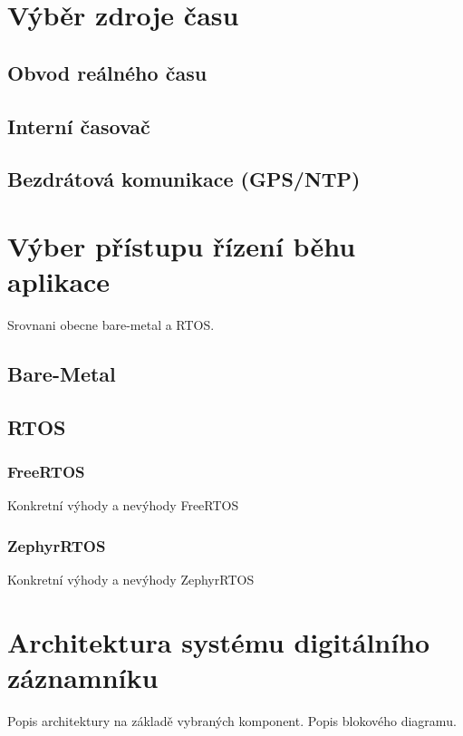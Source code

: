 \section{Výběr zdroje času}

\subsection{Obvod reálného času}

\subsection{Interní časovač}

\subsection{Bezdrátová komunikace (GPS/NTP)}

\section{Výber přístupu řízení běhu aplikace}
Srovnani obecne bare-metal a RTOS.


\subsection{Bare-Metal}

\subsection{RTOS}
\subsubsection{FreeRTOS}
Konkretní výhody a nevýhody FreeRTOS

\subsubsection{ZephyrRTOS}
Konkretní výhody a nevýhody ZephyrRTOS


\section{Architektura systému digitálního záznamníku}
Popis architektury na základě vybraných komponent. Popis blokového diagramu.

